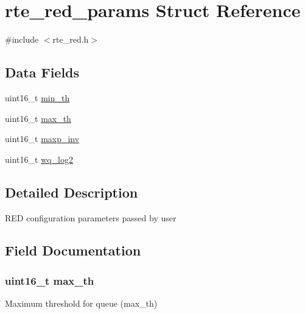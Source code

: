 \hypertarget{structrte__red__params}{}\section{rte\+\_\+red\+\_\+params Struct Reference}
\label{structrte__red__params}


{\ttfamily \#include $<$rte\+\_\+red.\+h$>$}

\subsection*{Data Fields}
\begin{DoxyCompactItemize}
\item 
uint16\+\_\+t \hyperlink{structrte__red__params_a8e992dc2fb3e3d3891b69a86bfb1aef3}{min\+\_\+th}
\item 
uint16\+\_\+t \hyperlink{structrte__red__params_af32dc574ecda752ca24e1cd20d89ae1e}{max\+\_\+th}
\item 
uint16\+\_\+t \hyperlink{structrte__red__params_aed8a08ae7a4987eb9ab79cbc9571b3d1}{maxp\+\_\+inv}
\item 
uint16\+\_\+t \hyperlink{structrte__red__params_ab18d7bfce2a3bb2753c647e58da944eb}{wq\+\_\+log2}
\end{DoxyCompactItemize}


\subsection{Detailed Description}
R\+E\+D configuration parameters passed by user 

\subsection{Field Documentation}
\hypertarget{structrte__red__params_af32dc574ecda752ca24e1cd20d89ae1e}{}
\subsubsection[{max\+\_\+th}]{\setlength{\rightskip}{0pt plus 5cm}uint16\+\_\+t max\+\_\+th}\label{structrte__red__params_af32dc574ecda752ca24e1cd20d89ae1e}
Maximum threshold for queue (max\+\_\+th) \hypertarget{structrte__red__params_aed8a08ae7a4987eb9ab79cbc9571b3d1}{}
